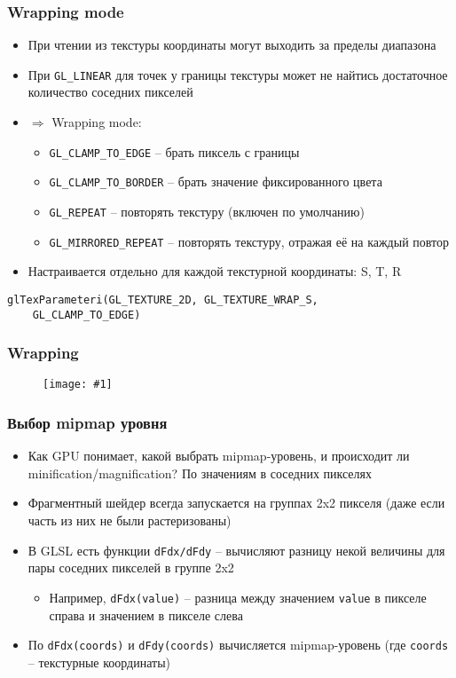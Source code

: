\documentclass{beamer}
\newcommand{\slideimage}[1]{
  \begin{figure}
    \begin{adjustbox}{width=\textwidth, totalheight=\textheight-2\baselineskip-2\baselineskip,keepaspectratio}
      \texttt{[image: \#1]}
    \end{adjustbox}
  \end{figure}
}
\begin{document}
\begin{frame}[fragile]
\frametitle{Wrapping mode}
\begin{itemize}
\item При чтении из текстуры координаты могут выходить за пределы диапазона
\pause
\item При \verb|GL_LINEAR| для точек у границы текстуры может не найтись достаточное количество соседних пикселей
\pause
\item \begin{math}\Rightarrow\end{math} Wrapping mode:
\begin{itemize}
\item \verb|GL_CLAMP_TO_EDGE| -- брать пиксель с границы
\item \verb|GL_CLAMP_TO_BORDER| -- брать значение фиксированного цвета
\item \verb|GL_REPEAT| -- повторять текстуру (включен по умолчанию)
\item \verb|GL_MIRRORED_REPEAT| -- повторять текстуру, отражая её на каждый повтор
\end{itemize}
\pause
\item Настраивается отдельно для каждой текстурной координаты: S, T, R
\end{itemize}
\begin{verbatim}
glTexParameteri(GL_TEXTURE_2D, GL_TEXTURE_WRAP_S,
    GL_CLAMP_TO_EDGE)
\end{verbatim}
\end{frame}

\begin{frame}
\frametitle{Wrapping}
\slideimage{wrapping.png}
\end{frame}

\begin{frame}[fragile]
\frametitle{Выбор mipmap уровня}
\begin{itemize}
\item Как GPU понимает, какой выбрать mipmap-уровень, и происходит ли minification/magnification? \pause По значениям в соседних пикселях
\pause
\item Фрагментный шейдер всегда запускается на группах 2x2 пикселя (даже если часть из них не были растеризованы)
\pause
\item В GLSL есть функции \verb|dFdx/dFdy| -- вычисляют разницу некой величины для пары соседних пикселей в группе 2x2
\pause
\begin{itemize}
\item Например, \verb|dFdx(value)| -- разница между значением \verb|value| в пикселе справа и значением в пикселе слева
\end{itemize}
\pause
\item По \verb|dFdx(coords)| и \verb|dFdy(coords)| вычисляется mipmap-уровень (где \verb|coords| -- текстурные координаты)
\end{itemize}
\end{frame}
\end{document}
